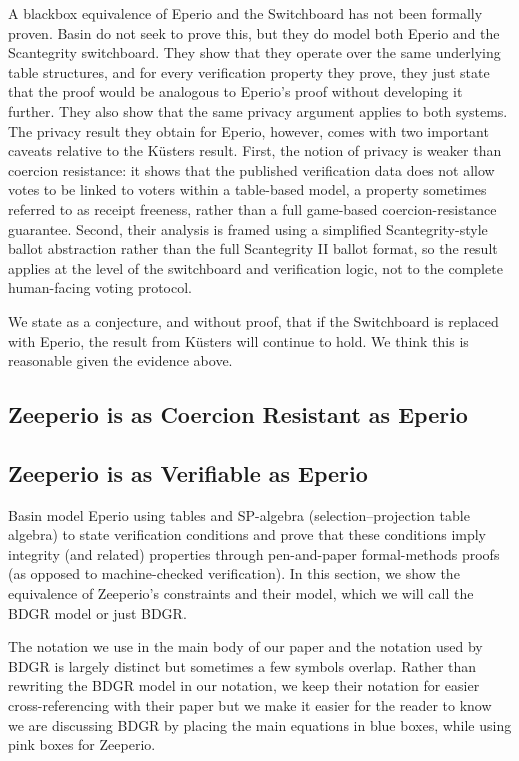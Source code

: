 A blackbox equivalence of Eperio and the Switchboard has not been formally proven. Basin \etal do not seek to prove this, but they do model both Eperio and the Scantegrity switchboard. They show that they operate over the same underlying table structures, and for every verification property they prove, they just state that the proof would be analogous to Eperio's proof without developing it further. They also show that the same privacy argument applies to both systems. The privacy result they obtain for Eperio, however, comes with two important caveats relative to the K{\"u}sters \etal result. First, the notion of privacy is weaker than coercion resistance: it shows that the published verification data does not allow votes to be linked to voters within a table-based model, a property sometimes referred to as receipt freeness, rather than a full game-based coercion-resistance guarantee. Second, their analysis is framed using a simplified Scantegrity-style ballot abstraction rather than the full Scantegrity II ballot format, so the result applies at the level of the switchboard and verification logic, not to the complete human-facing voting protocol.

We state as a conjecture, and without proof, that if the Switchboard is replaced with Eperio, the result from K{\"u}sters \etal will continue to hold. We think this is reasonable given the evidence above.

\subsection{Zeeperio is as Coercion Resistant as Eperio}
\label{sec:coercion}


\subsection{Zeeperio is as Verifiable as Eperio}
\label{sec:verifiable}

Basin \etal model Eperio using tables and SP-algebra (selection–projection table algebra) to state verification conditions and prove that these conditions imply integrity (and related) properties through pen-and-paper formal-methods proofs (as opposed to machine-checked verification). In this section, we show the equivalence of Zeeperio's constraints and their model, which we will call the BDGR model or just BDGR.

The notation we use in the main body of our paper and the notation used by BDGR is largely distinct but sometimes a few symbols overlap. Rather than rewriting the BDGR model in our notation, we keep their notation for easier cross-referencing with their paper but we make it easier for the reader to know we are discussing BDGR by placing the main equations in blue boxes, while using pink boxes for Zeeperio.

